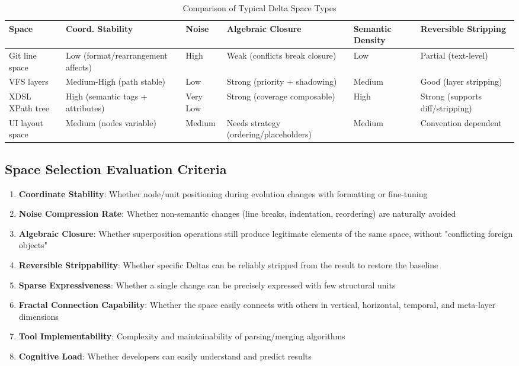 \documentclass[11pt]{article}
\begin{document}
\begin{table}[htbp]
\centering
\small 
\caption{Comparison of Typical Delta Space Types}
\begin{tabularx}{\textwidth}{@{} >{\raggedright\arraybackslash}X >{\raggedright\arraybackslash}X >{\raggedright\arraybackslash}X >{\raggedright\arraybackslash}X >{\raggedright\arraybackslash}X >{\raggedright\arraybackslash}X @{}}
\toprule
\textbf{Space} & \textbf{Coord. Stability} & \textbf{Noise} & \textbf{Algebraic Closure} & \textbf{Semantic Density} & \textbf{Reversible Stripping} \\
\midrule
Git line space & Low (format/rearrangement affects) & High & Weak (conflicts break closure) & Low & Partial (text-level) \\
\addlinespace
VFS layers & Medium-High (path stable) & Low & Strong (priority + shadowing) & Medium & Good (layer stripping) \\
\addlinespace
XDSL XPath tree & High (semantic tags + attributes) & Very Low & Strong (coverage composable) & High & Strong (supports diff/stripping) \\
\addlinespace
UI layout space & Medium (nodes variable) & Medium & Needs strategy (ordering/placeholders) & Medium & Convention dependent \\
\bottomrule
\end{tabularx}
\end{table}

\subsection{Space Selection Evaluation Criteria}

\begin{enumerate}
\item \textbf{Coordinate Stability}: Whether node/unit positioning during evolution changes with formatting or fine-tuning
\item \textbf{Noise Compression Rate}: Whether non-semantic changes (line breaks, indentation, reordering) are naturally avoided
\item \textbf{Algebraic Closure}: Whether superposition operations still produce legitimate elements of the same space, without "conflicting foreign objects"
\item \textbf{Reversible Strippability}: Whether specific Deltas can be reliably stripped from the result to restore the baseline
\item \textbf{Sparse Expressiveness}: Whether a single change can be precisely expressed with few structural units
\item \textbf{Fractal Connection Capability}: Whether the space easily connects with others in vertical, horizontal, temporal, and meta-layer dimensions
\item \textbf{Tool Implementability}: Complexity and maintainability of parsing/merging algorithms
\item \textbf{Cognitive Load}: Whether developers can easily understand and predict results
\end{enumerate}
\end{document}
